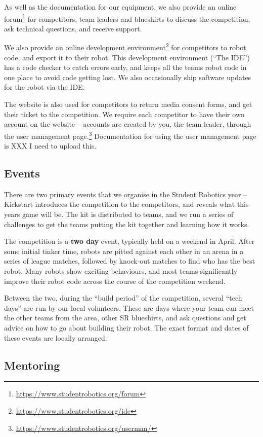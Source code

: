 \documentclass[a4paper]{article}
\begin{document}
As well as the documentation for our equipment, we also provide an online
forum\footnote{\url{https://www.studentrobotics.org/forum}} for competitors,
team leaders and blueshirts to discuss the competition, ask technical questions,
and receive support.

We also provide an online development
environment\footnote{\url{https://www.studentrobotics.org/ide}} for competitors
to robot code, and export it to their robot. This development environment
(``The IDE'') has a code checker to catch errors early, and keeps all the
teams robot code in one place to avoid code getting lost. We also occasionally
ship software updates for the robot via the IDE.

The website is also used for competitors to return media consent forms, and
get their ticket to the competition. We require each competitor to have their
own account on the website -- accounts are created by you, the team leader,
through the user management
page.\footnote{\url{https://www.studentrobotics.org/userman/}} Documentation
for using the user management page is XXX I need to upload this.

\subsection*{Events}

There are two primary events that we organise in the Student Robotics year --
Kickstart introduces the competition to the competitors, and reveals what this
years game will be. The kit is distributed to teams, and we run a series of
challenges to get the teams putting the kit together and learning how it works.

The competition is a \textbf{two day} event, typically held on a weekend in
April. After some initial tinker time, robots are pitted against each other in
an arena in a series of league matches, followed by knock-out matches to find
who has the best robot. Many robots show exciting behaviours, and most teams
significantly improve their robot code across the course of the competition
weekend.

Between the two, during the ``build period'' of the competition, several ``tech
days'' are run by our local volunteers.  These are days where your team can
meet the other teams from the area, other SR blueshirts, and ask questions and
get advice on how to go about building their robot. The exact format and dates
of these events are locally arranged.

\subsection*{Mentoring}
\end{document}
